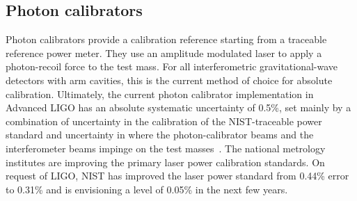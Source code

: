 \subsection{Photon calibrators}
Photon calibrators provide a calibration reference starting from a traceable reference power meter. They use an amplitude modulated laser to apply a photon-recoil force to the test mass. For all interferometric gravitational-wave detectors with arm cavities, this is the current method of choice for absolute calibration.
Ultimately, the current photon calibrator implementation in Advanced LIGO has an absolute systematic uncertainty of 0.5\%, set mainly by a combination of uncertainty in the calibration of the NIST-traceable power standard and uncertainty in where the photon-calibrator beams and the interferometer beams impinge on the test masses~\cite{ALIGOPhotCalib2016, NISTWorkshop2019}. The national metrology institutes are improving the primary laser power calibration standards. On request of LIGO, NIST has improved the laser power standard from 0.44\% error to 0.31\% and is envisioning a level of 0.05\% in the next few years.

